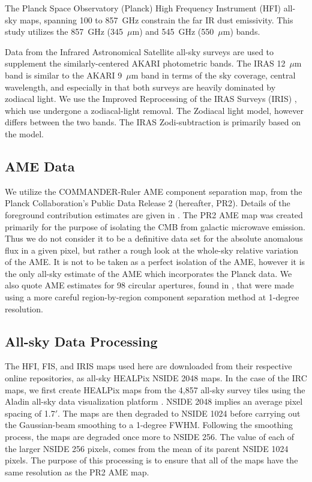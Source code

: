 \documentclass[preprint2,longabstract]{aastex}
\begin{document}
     The Planck Space Observatory (Planck) High Frequency Instrument (HFI) all-sky maps, spanning 100 to 857~GHz \citep{hfi14viii} constrain the far IR dust emissivity. This study utilizes the 857~GHz (345~$\mu$m) and 545~GHz (550~$\mu$m) bands.

     Data from the Infrared Astronomical Satellite \citep{iras84} all-sky surveys are used to supplement the similarly-centered AKARI photometric bands. The IRAS 12~$\mu$m band is similar to the AKARI 9~$\mu$m band in terms of the sky coverage, central wavelength, and especially in that both surveys are heavily dominated by zodiacal light. We use the Improved Reprocessing of the IRAS Surveys (IRIS) \citep{iris05}, which use undergone a zodiacal-light removal. The Zodiacal light model, however differs between the two bands. The IRAS Zodi-subtraction is primarily based on the \cite{kelsall98} model.

\subsection{AME Data}
     We utilize the COMMANDER-Ruler AME component separation map, from the Planck Collaboration's Public Data Release 2 (hereafter, PR2). Details of the foreground contribution estimates are given in \cite{planckXII}. The PR2 AME map was created primarily for the purpose of isolating the CMB from galactic microwave emission. Thus we do not consider it to be a definitive data set for the absolute anomalous flux in a given pixel, but rather a rough look at the whole-sky relative variation of the AME. It is not to be taken as a perfect isolation of the AME, however it is the only all-sky estimate of the AME which incorporates the Planck data. We also quote AME estimates for 98 circular apertures, found in \cite{planckXV}, that were made using a more careful region-by-region component separation method at 1-degree resolution.

\subsection{All-sky Data Processing}

      The HFI, FIS, and IRIS maps used here are downloaded from their respective online repositories, as all-sky HEALPix \citep{gorski15} NSIDE 2048 maps. In the case of the IRC maps, we first create HEALPix maps from the 4,857 all-sky survey tiles using the Aladin all-sky data visualization platform \citep{bonnarel00}. NSIDE 2048 implies an average pixel spacing of 1.7$'$. The maps are then degraded to NSIDE 1024 before carrying out the Gaussian-beam smoothing to a 1-degree FWHM. Following the smoothing process, the maps are degraded once more to NSIDE 256. The value of each of the larger NSIDE 256 pixels, comes from the mean of its parent NSIDE 1024 pixels. The purpose of this processing is to ensure that all of the maps have the same resolution as the PR2 AME map.
\end{document}
